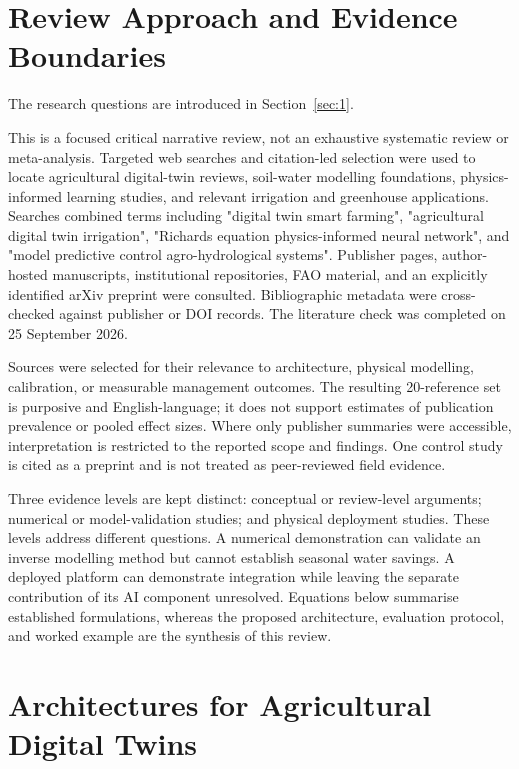 \documentclass[11pt,a4paper]{article}
\begin{document}
\section{Review Approach and Evidence Boundaries}

\label{sec:2}

The research questions are introduced in Section~\ref{sec:1}.

This is a focused critical narrative review, not an exhaustive systematic review or meta-analysis. Targeted web searches and citation-led selection were used to locate agricultural digital-twin reviews, soil-water modelling foundations, physics-informed learning studies, and relevant irrigation and greenhouse applications. Searches combined terms including "digital twin smart farming", "agricultural digital twin irrigation", "Richards equation physics-informed neural network", and "model predictive control agro-hydrological systems". Publisher pages, author-hosted manuscripts, institutional repositories, FAO material, and an explicitly identified arXiv preprint were consulted. Bibliographic metadata were cross-checked against publisher or DOI records. The literature check was completed on 25 September 2026.

Sources were selected for their relevance to architecture, physical modelling, calibration, or measurable management outcomes. The resulting 20-reference set is purposive and English-language; it does not support estimates of publication prevalence or pooled effect sizes. Where only publisher summaries were accessible, interpretation is restricted to the reported scope and findings. One control study \cite{R18} is cited as a preprint and is not treated as peer-reviewed field evidence.

Three evidence levels are kept distinct: conceptual or review-level arguments; numerical or model-validation studies; and physical deployment studies. These levels address different questions. A numerical demonstration can validate an inverse modelling method but cannot establish seasonal water savings. A deployed platform can demonstrate integration while leaving the separate contribution of its AI component unresolved. Equations below summarise established formulations, whereas the proposed architecture, evaluation protocol, and worked example are the synthesis of this review.

\section{Architectures for Agricultural Digital Twins}
\end{document}
